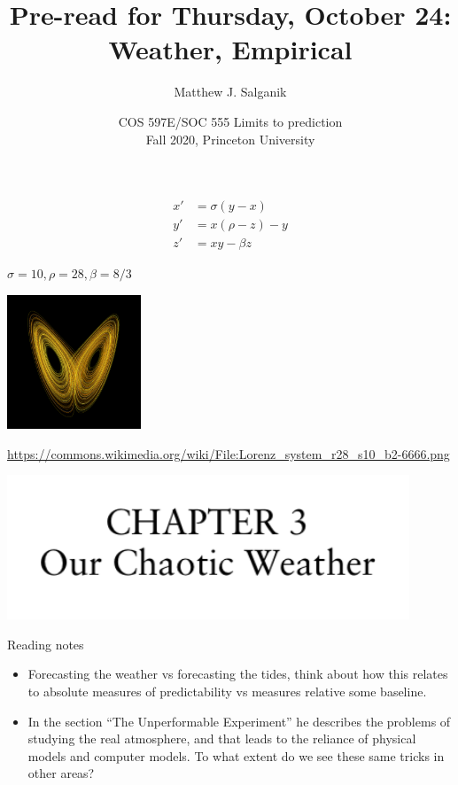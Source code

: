 \documentclass[aspectratio=169]{beamer}
\title[]{Pre-read for Thursday, October 24:\\Weather, Empirical}
\author[]{Matthew J. Salganik}
\institute[]{}
\date[]{COS 597E/SOC 555 Limits to prediction\\Fall 2020, Princeton University}
\begin{document}
\frame{\titlepage}
\begin{frame}
\frametitle{}

\begin{align*}
  x' &= \sigma(y-x) \\
  y' &= x(\rho-z)-y \\
  z' &= xy-\beta z
\end{align*}
\begin{center}
$\sigma = 10, \rho = 28,  \beta = 8/3$ 
\end{center}
\begin{center}
\includegraphics[width = 0.3\textwidth]{figures/Lorenz_system_r28_s10_b2-6666}
\end{center}

\vfill
\tiny{\url{https://commons.wikimedia.org/wiki/File:Lorenz_system_r28_s10_b2-6666.png}}
\end{frame}
\begin{frame}

\begin{center}
\includegraphics[width = 0.9\textwidth]{figures/lorenz_essence_1993_ch3}
\end{center}

\end{frame}
\begin{frame}

Reading notes
\begin{itemize}
\item Forecasting the weather vs forecasting the tides, think about how this relates to absolute measures of predictability vs measures relative some baseline.
\pause
\item In the section ``The Unperformable Experiment'' he describes the problems of studying the real atmosphere, and that leads to the reliance of physical models and computer models.  To what extent do we see these same tricks in other areas?
\end{itemize}

\end{frame}
\end{document}

